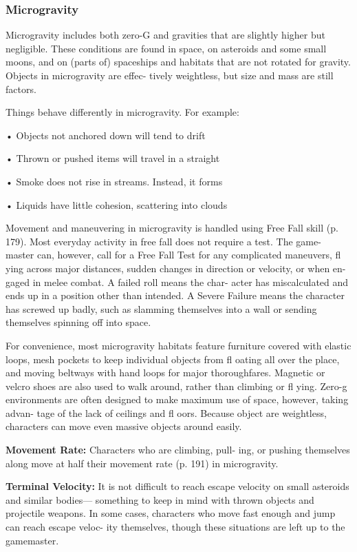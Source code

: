 \subsubsection{Microgravity}

Microgravity includes both zero-G and gravities that 
are slightly higher but negligible. These conditions are 
found in space, on asteroids and some small moons, 
and on (parts of) spaceships and habitats that are not 
rotated for gravity. Objects in microgravity are effec-
tively weightless, but size and mass are still factors.

Things behave differently in microgravity. For 
example:

•  Objects not anchored down will tend to drift 

•  Thrown or pushed items will travel in a straight 

•  Smoke does not rise in streams. Instead, it forms 

•  Liquids have little cohesion, scattering into clouds 

Movement and maneuvering in microgravity is 
handled using Free Fall skill (p. 179). Most everyday 
activity in free fall does not require a test. The game-
master can, however, call for a Free Fall Test for any 
complicated maneuvers, fl ying across major distances, 
sudden changes in direction or velocity, or when en-
gaged in melee combat. A failed roll means the char-
acter has miscalculated and ends up in a position other 
than intended. A Severe Failure means the character has 
screwed up badly, such as slamming themselves into a 
wall or sending themselves spinning off into space.

For convenience, most microgravity habitats 
feature furniture covered with elastic loops, mesh 
pockets to keep individual objects from fl oating all 
over the place, and moving beltways with hand loops 
for major thoroughfares. Magnetic or velcro shoes 
are also used to walk around, rather than climbing 
or fl ying. Zero-g environments are often designed to 
make maximum use of space, however, taking advan-
tage of the lack of ceilings and fl oors. Because object 
are weightless, characters can move even massive 
objects around easily.

\textbf{Movement Rate: }Characters who are climbing, pull-
ing, or pushing themselves along move at half their 
movement rate (p. 191) in microgravity.

\textbf{Terminal Velocity:} It is not difficult to reach escape 
velocity on small asteroids and similar bodies—
something to keep in mind with thrown objects and 
projectile weapons. In some cases, characters who 
move fast enough and jump can reach escape veloc-
ity themselves, though these situations are left up to 
the gamemaster.

